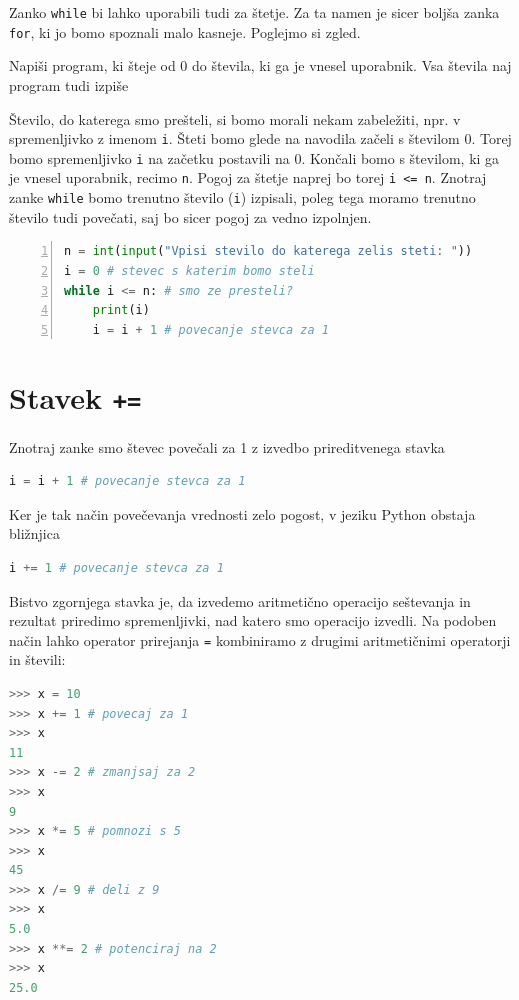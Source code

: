 Zanko \texttt{while} bi lahko uporabili tudi za štetje. Za ta namen je sicer boljša zanka \texttt{for}, ki jo bomo spoznali malo kasneje. Poglejmo si zgled.
\begin{zgled}
Napiši program, ki šteje od 0 do števila, ki ga je vnesel uporabnik. Vsa števila naj program tudi izpiše
\end{zgled}
\begin{resitev}
Število, do katerega smo prešteli, si bomo morali nekam zabeležiti, npr. v spremenljivko z imenom \texttt{i}. Šteti bomo glede na navodila začeli s številom 0. Torej bomo spremenljivko \texttt{i} na začetku postavili na 0. Končali bomo s številom, ki ga je vnesel uporabnik, recimo \texttt{n}. Pogoj za štetje naprej bo torej \texttt{i <= n}. Znotraj zanke \texttt{while} bomo trenutno število (\texttt{i}) izpisali, poleg tega moramo trenutno število tudi povečati, saj bo sicer pogoj za vedno izpolnjen. 
\begin{lstlisting}[language=Python, showstringspaces=false,numbers=left]
n = int(input("Vpisi stevilo do katerega zelis steti: "))
i = 0 # stevec s katerim bomo steli
while i <= n: # smo ze presteli?
    print(i)
    i = i + 1 # povecanje stevca za 1
\end{lstlisting}
\end{resitev}

\section{Stavek \texttt{+=}}
Znotraj zanke smo števec povečali za 1 z izvedbo prireditvenega stavka
\begin{lstlisting}[language=Python, showstringspaces=false]
i = i + 1 # povecanje stevca za 1
\end{lstlisting}
Ker je tak način povečevanja vrednosti zelo pogost, v jeziku Python obstaja bližnjica
\begin{lstlisting}[language=Python, showstringspaces=false]
i += 1 # povecanje stevca za 1
\end{lstlisting}
Bistvo zgornjega stavka je, da izvedemo aritmetično operacijo seštevanja in rezultat priredimo spremenljivki, nad katero smo operacijo izvedli. Na podoben način lahko operator prirejanja \texttt{=} kombiniramo z drugimi aritmetičnimi operatorji in števili:
\begin{lstlisting}[language=Python, showstringspaces=false]
>>> x = 10
>>> x += 1 # povecaj za 1
>>> x
11
>>> x -= 2 # zmanjsaj za 2
>>> x
9
>>> x *= 5 # pomnozi s 5
>>> x
45
>>> x /= 9 # deli z 9
>>> x
5.0
>>> x **= 2 # potenciraj na 2
>>> x
25.0
\end{lstlisting}

